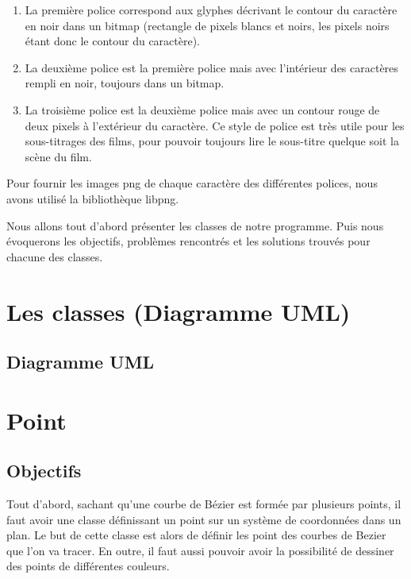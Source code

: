 \documentclass[a4paper, 12pt]{article}
\begin{document}
	\begin{enumerate}
		\item La première police correspond aux glyphes décrivant le contour du caractère en noir dans un bitmap (rectangle de pixels blancs et noirs, les pixels noirs étant donc le contour du caractère). 
		\item La deuxième police est la première police mais avec l’intérieur des caractères rempli en noir, toujours dans un bitmap. 
		\item La troisième police est la deuxième police mais avec un contour rouge de deux pixels à l’extérieur du caractère. Ce style de police est très utile pour les sous-titrages des films, pour pouvoir toujours lire le sous-titre quelque soit la scène du film. 
 	\end{enumerate}

	Pour fournir les images png de chaque caractère des différentes polices, nous avons utilisé la bibliothèque libpng.
\newline

Nous allons tout d’abord présenter les classes de notre programme. Puis nous évoquerons les objectifs, problèmes rencontrés et les solutions trouvés pour chacune des classes.


	
	\newpage

\section{Les classes (Diagramme UML)}			
\subsection{Diagramme UML}

\section{Point}	
\subsection{Objectifs}
	Tout d'abord, sachant qu'une courbe de Bézier est formée par plusieurs points, il faut avoir une classe définissant un point sur un système de coordonnées dans un plan. Le but de cette classe est alors de définir les point des courbes de Bezier que l'on va tracer. En outre, il faut aussi pouvoir avoir la possibilité de dessiner des points de différentes couleurs.
	
\end{document}
